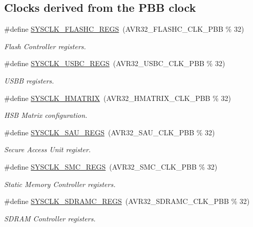 \subsection*{\-Clocks derived from the \-P\-B\-B clock}
\begin{DoxyCompactItemize}
\item 
\#define \hyperlink{group__sysclk__group_ga47b081ba5de90a8ea89b8a844e82c14a}{\-S\-Y\-S\-C\-L\-K\-\_\-\-F\-L\-A\-S\-H\-C\-\_\-\-R\-E\-G\-S}~(\-A\-V\-R32\-\_\-\-F\-L\-A\-S\-H\-C\-\_\-\-C\-L\-K\-\_\-\-P\-B\-B \% 32)
\begin{DoxyCompactList}\small\item\em \-Flash \-Controller registers. \end{DoxyCompactList}\item 
\#define \hyperlink{group__sysclk__group_ga1f50b29ea7a96a6595b6256118ec6a34}{\-S\-Y\-S\-C\-L\-K\-\_\-\-U\-S\-B\-C\-\_\-\-R\-E\-G\-S}~(\-A\-V\-R32\-\_\-\-U\-S\-B\-C\-\_\-\-C\-L\-K\-\_\-\-P\-B\-B \% 32)
\begin{DoxyCompactList}\small\item\em \-U\-S\-B\-B registers. \end{DoxyCompactList}\item 
\#define \hyperlink{group__sysclk__group_ga766dce154a1fb38bb35e6e98cd51a9b1}{\-S\-Y\-S\-C\-L\-K\-\_\-\-H\-M\-A\-T\-R\-I\-X}~(\-A\-V\-R32\-\_\-\-H\-M\-A\-T\-R\-I\-X\-\_\-\-C\-L\-K\-\_\-\-P\-B\-B \% 32)
\begin{DoxyCompactList}\small\item\em \-H\-S\-B \-Matrix configuration. \end{DoxyCompactList}\item 
\#define \hyperlink{group__sysclk__group_gafe8483e2e78077a95841ccf52b2da1a5}{\-S\-Y\-S\-C\-L\-K\-\_\-\-S\-A\-U\-\_\-\-R\-E\-G\-S}~(\-A\-V\-R32\-\_\-\-S\-A\-U\-\_\-\-C\-L\-K\-\_\-\-P\-B\-B \% 32)
\begin{DoxyCompactList}\small\item\em \-Secure \-Access \-Unit register. \end{DoxyCompactList}\item 
\#define \hyperlink{group__sysclk__group_ga8425ce428af87e00693efc695ac3b73e}{\-S\-Y\-S\-C\-L\-K\-\_\-\-S\-M\-C\-\_\-\-R\-E\-G\-S}~(\-A\-V\-R32\-\_\-\-S\-M\-C\-\_\-\-C\-L\-K\-\_\-\-P\-B\-B \% 32)
\begin{DoxyCompactList}\small\item\em \-Static \-Memory \-Controller registers. \end{DoxyCompactList}\item 
\#define \hyperlink{group__sysclk__group_ga386f643ce38c1c6721d07c559a70f365}{\-S\-Y\-S\-C\-L\-K\-\_\-\-S\-D\-R\-A\-M\-C\-\_\-\-R\-E\-G\-S}~(\-A\-V\-R32\-\_\-\-S\-D\-R\-A\-M\-C\-\_\-\-C\-L\-K\-\_\-\-P\-B\-B \% 32)
\begin{DoxyCompactList}\small\item\em \-S\-D\-R\-A\-M \-Controller registers. \end{DoxyCompactList}\end{DoxyCompactItemize}
